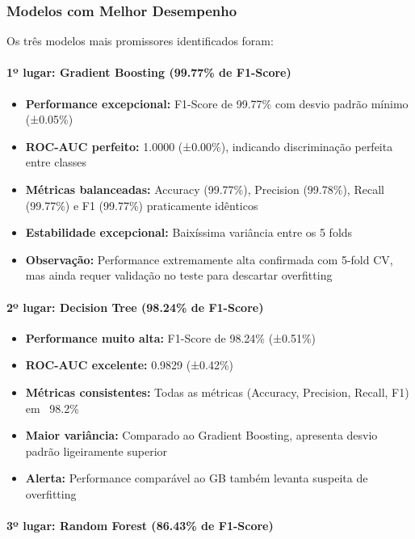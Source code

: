 \documentclass[12pt,a4paper]{article}
\begin{document}
\subsubsection{Modelos com Melhor Desempenho}

Os três modelos mais promissores identificados foram:

\paragraph{1º lugar: Gradient Boosting (99.77\% de F1-Score)}

\begin{itemize}
    \item \textbf{Performance excepcional:} F1-Score de 99.77\% com desvio padrão mínimo (±0.05\%)
    \item \textbf{ROC-AUC perfeito:} 1.0000 (±0.00\%), indicando discriminação perfeita entre classes
    \item \textbf{Métricas balanceadas:} Accuracy (99.77\%), Precision (99.78\%), Recall (99.77\%) e F1 (99.77\%) praticamente idênticos
    \item \textbf{Estabilidade excepcional:} Baixíssima variância entre os 5 folds
    \item \textbf{Observação:} Performance extremamente alta confirmada com 5-fold CV, mas ainda requer validação no teste para descartar overfitting
\end{itemize}

\paragraph{2º lugar: Decision Tree (98.24\% de F1-Score)}

\begin{itemize}
    \item \textbf{Performance muito alta:} F1-Score de 98.24\% (±0.51\%)
    \item \textbf{ROC-AUC excelente:} 0.9829 (±0.42\%)
    \item \textbf{Métricas consistentes:} Todas as métricas (Accuracy, Precision, Recall, F1) em ~98.2\%
    \item \textbf{Maior variância:} Comparado ao Gradient Boosting, apresenta desvio padrão ligeiramente superior
    \item \textbf{Alerta:} Performance comparável ao GB também levanta suspeita de overfitting
\end{itemize}

\paragraph{3º lugar: Random Forest (86.43\% de F1-Score)}
\end{document}
